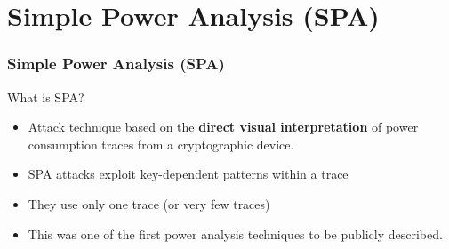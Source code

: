 \section{Simple Power Analysis (SPA)}

\begin{frame}
    \frametitle{Simple Power Analysis (SPA)}
    \begin{block}{What is SPA? }
        \begin{itemize}
            \item Attack technique based on the \textbf{direct visual interpretation} of power consumption traces from a cryptographic device.
            \item SPA attacks exploit key-dependent patterns within a trace
            \item They use only one trace (or very few traces)
            \item This was one of the first power analysis techniques to be publicly described.
        \end{itemize}
    \end{block}
\end{frame}

